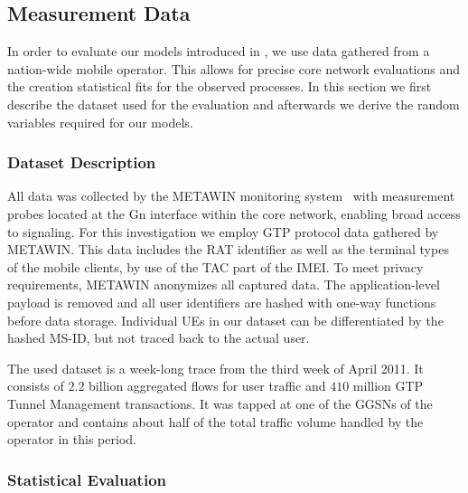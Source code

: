 \subsection{Measurement Data}\label{sec:cloud:virtualized_network_functions:measurement_data}

In order to evaluate our models introduced in , we use data gathered from a nation-wide mobile operator.
This allows for precise core network evaluations and the creation statistical fits for the observed processes.
In this section we first describe the dataset used for the evaluation and afterwards we derive the random variables required for our models.

\subsubsection*{Dataset Description}\label{sec:cloud:virtualized_network_functions:measurement_data:description}

\label{sec:dataset_description}

All data was collected by the \gls{METAWIN} monitoring system~\cite{Ricciato2006} with measurement probes located at the Gn interface within the core network, enabling broad access to signaling.
For this investigation we employ \gls{GTP} protocol data gathered by \gls{METAWIN}.
This data includes the \gls{RAT} identifier as well as the terminal types of the mobile clients, by use of the \gls{TAC} part of the \gls{IMEI}.
To meet privacy requirements, \gls{METAWIN} anonymizes all captured data.
The application-level payload is removed and all user identifiers are hashed with one-way functions before data storage.
Individual \glspl{UE} in our dataset can be differentiated by the hashed \gls{MS-ID}, but not traced back to the actual user.

The used dataset is a week-long trace from the third week of April 2011.
It consists of \(2.2\) billion aggregated flows for user traffic and \(410\) million \gls{GTP} Tunnel Management transactions.
It was tapped at one of the \glspl{GGSN} of the operator and contains about half of the total traffic volume handled by the operator in this period.

\subsubsection*{Statistical Evaluation}\label{sec:cloud:virtualized_network_functions:measurement_data:evaluation}

